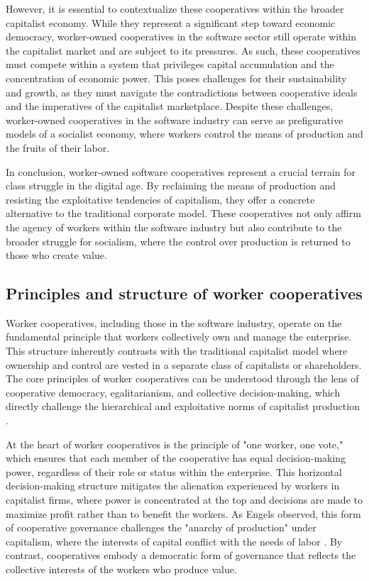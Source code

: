 \begin{refsection}
However, it is essential to contextualize these cooperatives within the broader capitalist economy. While they represent a significant step toward economic democracy, worker-owned cooperatives in the software sector still operate within the capitalist market and are subject to its pressures. As such, these cooperatives must compete within a system that privileges capital accumulation and the concentration of economic power. This poses challenges for their sustainability and growth, as they must navigate the contradictions between cooperative ideals and the imperatives of the capitalist marketplace. Despite these challenges, worker-owned cooperatives in the software industry can serve as prefigurative models of a socialist economy, where workers control the means of production and the fruits of their labor.

In conclusion, worker-owned software cooperatives represent a crucial terrain for class struggle in the digital age. By reclaiming the means of production and resisting the exploitative tendencies of capitalism, they offer a concrete alternative to the traditional corporate model. These cooperatives not only affirm the agency of workers within the software industry but also contribute to the broader struggle for socialism, where the control over production is returned to those who create value.

\subsection{Principles and structure of worker cooperatives}

Worker cooperatives, including those in the software industry, operate on the fundamental principle that workers collectively own and manage the enterprise. This structure inherently contrasts with the traditional capitalist model where ownership and control are vested in a separate class of capitalists or shareholders. The core principles of worker cooperatives can be understood through the lens of cooperative democracy, egalitarianism, and collective decision-making, which directly challenge the hierarchical and exploitative norms of capitalist production \cite[pp.~56-57]{webb1891}.

At the heart of worker cooperatives is the principle of "one worker, one vote," which ensures that each member of the cooperative has equal decision-making power, regardless of their role or status within the enterprise. This horizontal decision-making structure mitigates the alienation experienced by workers in capitalist firms, where power is concentrated at the top and decisions are made to maximize profit rather than to benefit the workers. As Engels observed, this form of cooperative governance challenges the "anarchy of production" under capitalism, where the interests of capital conflict with the needs of labor \cite[pp.~201-203]{engels1894}. By contrast, cooperatives embody a democratic form of governance that reflects the collective interests of the workers who produce value.


\end{refsection}
